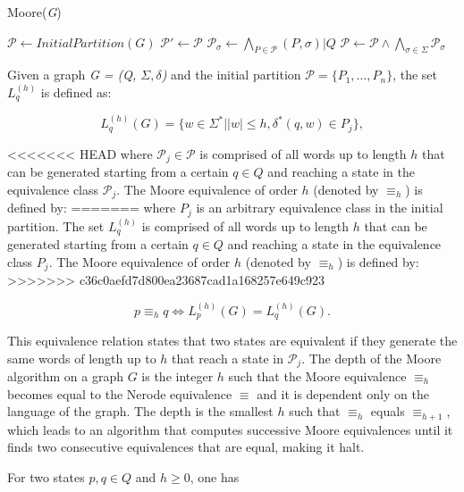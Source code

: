 {\begin{algorithm} [b]
  \caption{Moore(\textit{G})\label{alg:moore}}
    \begin{algorithmic}[1]
      \State $\mathcal{P} \leftarrow InitialPartition(G)$
      \Repeat
      	\State $\mathcal{P}' \leftarrow \mathcal{P}$
      	\ForAll{$\sigma \in \Sigma$}
      		\State $\mathcal{P}_{\sigma} \leftarrow \bigwedge_{P\in \mathcal{P}}(P,\sigma)|Q$
      	\EndFor
      	\State $\mathcal{P} \leftarrow \mathcal{P}\wedge\bigwedge_{\sigma\in\Sigma}\mathcal{P}_{\sigma}$
    \end{algorithmic}
  \end{algorithm}
 
Given a graph \textit{G = (Q, $\Sigma, \delta$)} and the initial partition $\mathcal{P} = \{P_1,\ldots, P_n\}$, the set $L_q^{(h)}$ is defined as:

\[
L_q^{(h)}(G) = \{w \in \Sigma^* | |w| \leq h, \delta^*(q,w) \in P_j\},
\]

<<<<<<< HEAD
\noindent where $\mathcal{P}_j \in \mathcal{P}$  is comprised of all words up to length $h$ that can be generated starting from a certain $q \in Q$ and reaching a state in the equivalence class $\mathcal{P}_j$. The Moore equivalence of order $h$ (denoted by $\equiv_h$) is defined by:
=======
\noindent where $P_j$ is an arbitrary equivalence class in the initial partition. The set $L_q^{(h)}$ is comprised of all words up to length $h$ that can be generated starting from a certain $q \in Q$ and reaching a state in the equivalence class $P_j$. The Moore equivalence of order $h$ (denoted by $\equiv_h$) is defined by:
>>>>>>> c36c0aefd7d800ea23687cad1a168257e649c923

\[
p \equiv_h q \Leftrightarrow L_p^{(h)}(G) = L_q^{(h)}(G).
\]

\noindent This equivalence relation states that two states are equivalent if they generate the same words of length up to $h$ that reach a state in $\mathcal{P}_j$. The depth of the Moore algorithm on a graph $G$ is the integer $h$ such that the Moore equivalence $\equiv_h$ becomes equal to the Nerode equivalence $\equiv$ and it is dependent only on the language of the graph. The depth is the smallest $h$ such that $\equiv_h$ equals $\equiv_{h+1}$, which leads to an algorithm that computes successive Moore equivalences until it finds two consecutive equivalences that are equal, making it halt.

\begin{proposition}\label{prop:makemooreeasy}
For two states $p, q \in Q$ and $h \geq 0$, one has


\end{proposition}}
